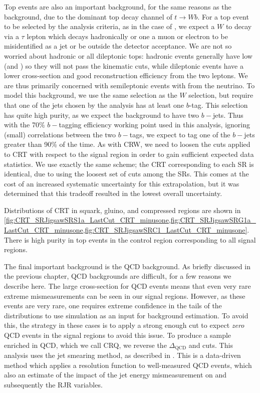 Top events are also an important background, for the same reasons as the \wjets background, due to the dominant top decay channel of $t \rightarrow Wb$.
For a top event to be selected by the analysis criteria, as in the case of \wjets, we expect a $W$ to decay via a $\tau$ lepton which decays hadronically or one a muon or electron to be misidentified as a jet or be outside the detector acceptance.
We are not so worried about hadronic or all dileptonic tops: hadronic \ttbar events generally have low \met (and ) so they will not pass the kinematic cuts, while dileptonic \ttbar events have a lower cross-section and good reconstruction efficiency from the two leptons.
We are thus primarily concerned with semileptonic \ttbar events with \met from the neutrino.
To model this background, we use the same selection as the $W$ selection, but require that one of the jets chosen by the analysis has at least one $b$-tag.
This selection has quite high purity, as we expect the \ttbar background to have two $b-$jets.
Thus with the 70\% $b-$tagging efficiency working point used in this analysis, ignoring (small) correlations between the two $b-$tags, we expect to tag one of the $b-$jets greater than 90\% of the time.
As with CRW, we need to loosen the cuts applied to CRT with respect to the signal region in order to gain sufficient expected data statistics.
We use exactly the same scheme; the CRT corresponding to each SR is identical, due to using the loosest set of cuts among the SRs.
This comes at the cost of an increased systematic uncertainty for this extrapolation, but it was determined that this tradeoff resulted in the lowest overall uncertainty.

Distributions of CRT in squark, gluino, and compressed regions are shown in \ref{fig:CRT_SRJigsawSRS1a_LastCut_CRT_minusone,fig:CRT_SRJigsawSRG1a_LastCut_CRT_minusone,fig:CRT_SRJigsawSRC1_LastCut_CRT_minusone}.
There is high purity in top events in the control region corresponding to all signal regions.

The final important background is the QCD background.
As briefly discussed in the previous chapter, QCD backgrounds are difficult, for a few reasons we describe here.
The large cross-section for QCD events means that even very rare extreme mismeasurements can be seen in our signal regions.
However, as these events are very rare, one requires extreme confidence in the tails of the distributions to use simulation as an input for background estimation.
To avoid this, the strategy in these cases is to apply a strong enough cut to expect \textit{zero} QCD events in the signal regions to avoid this issue.
To produce a sample enriched in QCD, which we call CRQ, we reverse the $\Delta_{\mathrm{QCD}}$ and  cuts.
This analysis uses the jet smearing method, as described in \cite{SUSY-2011-20}.
This is a data-driven method which applies a resolution function to well-measured QCD events, which also an estimate of the impact of the jet energy mismeasurement on \met and subsequently the RJR variables.

